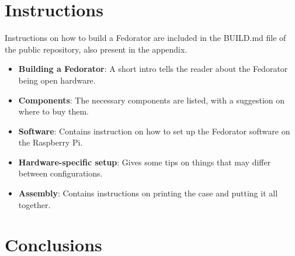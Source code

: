     \section{Instructions}
        Instructions on how to build a Fedorator are included in the BUILD.md file of the public repository, also present in the appendix.
        
        \begin{itemize}
            \item \textbf{Building a Fedorator}: A short intro tells the reader about the Fedorator being open hardware.
            \item \textbf{Components}: The necessary components are listed, with a suggestion on where to buy them.
            \item \textbf{Software}: Contains instruction on how to set up the Fedorator software on the Raspberry Pi.
            \item \textbf{Hardware-specific setup}: Gives some tips on things that may differ between configurations.
            \item \textbf{Assembly}: Contains instructions on printing the case and putting it all together.
        \end{itemize}
        
        
        \begin{comment}
        \todo{These are the final instructions that will be the "result" of the work.  Should they be inlined here?}
        \subsection{Bill of Materials}
            \todo{What is needed to get started - include a table and cost}
            \blind[3]
        \subsection{Step-by-step tutorial}
            \todo{The meat: how to build it from grounds up}
            \todo{Will not be present here, rather as an attachment.}
        \end{comment}
    \section{Conclusions}
        
        \blind[2]

